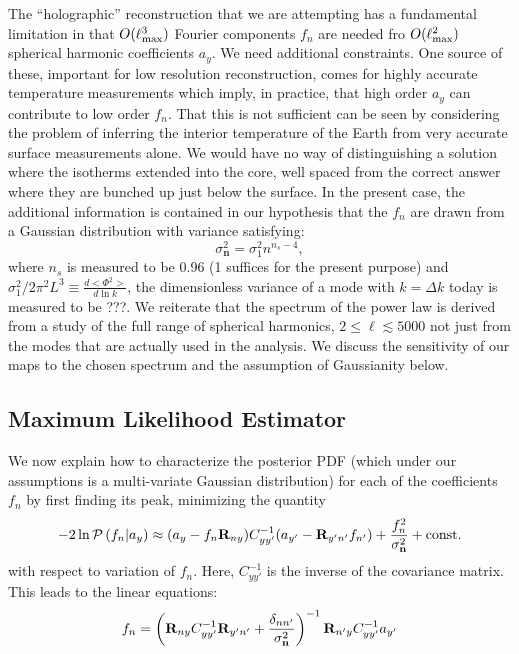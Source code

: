 \documentclass[useAMS,usenatbib,a4paper]{mn2e}
\begin{document}
The ``holographic'' reconstruction that we are attempting has a
fundamental limitation in that $O(\ell_{\rm max}^3)$ Fourier
components $f_n$ are needed fro $O(\ell_{\rm max}^2)$ spherical
harmonic coefficients $a_y$. We need additional constraints. One
source of these, important for low resolution reconstruction, comes
for highly accurate temperature measurements which imply, in practice,
that high order $a_y$ can contribute to low order $f_n$. That this is
not sufficient can be seen by considering the problem of inferring the
interior temperature of the Earth from very accurate surface
measurements alone. We would have no way of distinguishing a solution
where the isotherms extended into the core, well spaced from the
correct answer where they are bunched up just below the surface. In
the present case, the additional information is contained in our
hypothesis that the $f_n$ are drawn from a Gaussian distribution with
variance satisfying:
\begin{equation}
\sigma_\mathbf{n}^2=\sigma_1^2n^{n_s-4},
\end{equation}
where $n_s$ is measured to be 0.96 (1 suffices for the present
purpose) and $\sigma_1^2/2\pi^2L^3\equiv\frac{d<\Phi^2>}{d\ln k}$, the
dimensionless variance of a mode with $k=\Delta k$ today is measured
to be ???. We reiterate that the spectrum of the power law is derived
from a study of the full range of spherical harmonics,
$2\le\ell\lesssim5000$ not just from the modes that are actually used
in the analysis. We discuss the sensitivity of our maps to the chosen
spectrum and the assumption of Gaussianity below.

\subsection{Maximum Likelihood Estimator}

We now explain how to characterize the posterior PDF (which under our
assumptions is a multi-variate Gaussian distribution) for each of the
coefficients $f_n$ by first finding its peak, minimizing the quantity
\begin{equation}
-2\ln{\cal P}\left(f_n|a_y\right) \approx (a_y- f_n\mathbf{R}_{ny})C_{yy'}^{-1}(a_{y'}-\mathbf{R}_{y'n'}f_{n'})+\frac{f_n^2}{\sigma_{{\bf n}}^2} + \mathrm{const.}
\end{equation}
with respect to variation of $f_n$. Here, $C_{yy'}^{-1}$ is the
inverse of the covariance matrix. This leads to the linear equations:
\begin{equation}
f_n=\left(\mathbf{R}_{ny}C_{yy'}^{-1}\mathbf{R}_{y'n'}+\frac{\delta_{nn'}}{\sigma_{\bf n}^2}\right)^{-1}\mathbf{R}_{n'y}C_{yy'}^{-1}a_{y'}
\label{eq:bayes}
\end{equation}
\end{document}
